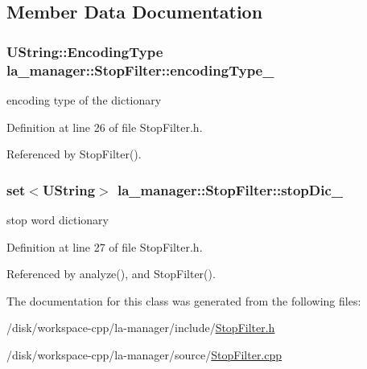\subsection{Member Data Documentation}
\hypertarget{classla__manager_1_1StopFilter_5e7ad9487b81a8ff5e4e35f5a785fe1e}{
\subsubsection[{encodingType\_\-}]{\setlength{\rightskip}{0pt plus 5cm}UString::EncodingType {\bf la\_\-manager::StopFilter::encodingType\_\-}}}
\label{classla__manager_1_1StopFilter_5e7ad9487b81a8ff5e4e35f5a785fe1e}


encoding type of the dictionary 



Definition at line 26 of file StopFilter.h.

Referenced by StopFilter().\hypertarget{classla__manager_1_1StopFilter_fed4aa3b6415be249303daacbb271673}{
\subsubsection[{stopDic\_\-}]{\setlength{\rightskip}{0pt plus 5cm}set$<$UString$>$ {\bf la\_\-manager::StopFilter::stopDic\_\-}}}
\label{classla__manager_1_1StopFilter_fed4aa3b6415be249303daacbb271673}


stop word dictionary 



Definition at line 27 of file StopFilter.h.

Referenced by analyze(), and StopFilter().

The documentation for this class was generated from the following files:\begin{CompactItemize}
\item 
/disk/workspace-cpp/la-manager/include/\hyperlink{StopFilter_8h}{StopFilter.h}\item 
/disk/workspace-cpp/la-manager/source/\hyperlink{StopFilter_8cpp}{StopFilter.cpp}\end{CompactItemize}
